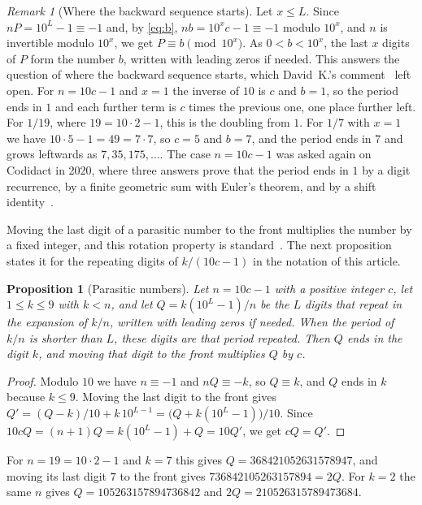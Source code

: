 \documentclass[11pt,a4paper]{amsart}
\newtheorem{proposition}{Proposition}
\theoremstyle{definition}
\theoremstyle{remark}
\newtheorem{remark}{Remark}
\begin{document}
\begin{remark}[Where the backward sequence starts]\label{rem:start}
Let $x \le L$. Since $nP = 10^L - 1 \equiv -1$ and, by \eqref{eq:b}, $nb = 10^x c - 1 \equiv -1$
modulo $10^x$, and $n$ is invertible modulo $10^x$, we get
$P \equiv b \pmod{10^x}$. As $0 < b < 10^x$, the last $x$ digits of $P$ form the
number $b$, written with leading zeros if needed. This answers the question of where the backward sequence starts, which David~K.'s comment~\cite{mse1365506} left open. For $n = 10c - 1$ and $x = 1$ the inverse of $10$ is $c$ and $b = 1$, so the period ends in $1$ and each further term is $c$ times the previous one, one place further left. For $1/19$, where $19 = 10\cdot 2 - 1$, this is the doubling from $1$. For $1/7$ with
$x = 1$ we have $10\cdot 5 - 1 = 49 = 7\cdot 7$, so $c = 5$ and $b = 7$, and the
period ends in $7$ and grows leftwards as $7, 35, 175, \dots$. The case
$n = 10c - 1$ was asked again on Codidact in 2020, where three answers prove
that the period ends in $1$ by a digit recurrence, by a finite geometric sum
with Euler's theorem, and by a shift identity~\cite{codidact278629}.
\end{remark}

Moving the last digit of a parasitic number to the front multiplies the number by a fixed integer, and this rotation property is standard~\cite{wiki-parasitic,grinberg}. The next proposition states it for the repeating digits of $k/(10c-1)$ in the notation of this article.

\begin{proposition}[Parasitic numbers]\label{prop:parasitic}
Let $n = 10c - 1$ with a positive integer $c$, let $1 \le k \le 9$ with $k < n$, and let $Q = k(10^L - 1)/n$ be the $L$ digits that repeat in the expansion of $k/n$, written with leading zeros if needed. When the period of $k/n$ is shorter than $L$, these digits are that period repeated. Then $Q$ ends in the digit $k$,
and moving that digit to the front multiplies $Q$ by $c$.
\end{proposition}

\begin{proof}
Modulo $10$ we have $n \equiv -1$ and $nQ \equiv -k$, so $Q \equiv k$, and $Q$
ends in $k$ because $k \le 9$. Moving the last digit to the front gives
$Q' = (Q - k)/10 + k\,10^{L-1} = \bigl(Q + k(10^L - 1)\bigr)/10$. Since
$10cQ = (n+1)Q = k(10^L - 1) + Q = 10Q'$, we get $cQ = Q'$.
\end{proof}

For $n = 19 = 10\cdot 2 - 1$ and $k = 7$ this gives $Q = 368421052631578947$, and moving its last digit $7$ to the front gives $736842105263157894 = 2Q$. For $k = 2$ the same $n$ gives $Q = 105263157894736842$ and $2Q = 210526315789473684$.
\end{document}
